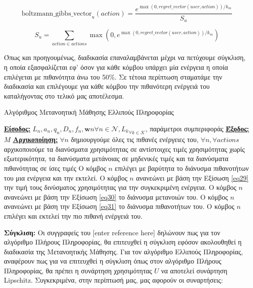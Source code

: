 \vspace{-3pt}

\[
\text{boltzmann\_gibbs\_vector}_u(action) = \frac{e^{\max(0, regret\_vector(user, action))/k_m}}{S_u}
\]

\[S_u = \sum_{action \in actions} \max(0, e^{\max(0, regret\_vector(user, action))/k_m})\]

Όπως και προηγουμένως, διαδικασία επαναλαμβάνεται μέχρι να πετύχουμε σύγκλιση, η οποία εξασφαλίζεται εφ' όσον για κάθε κόμβου υπάρχει μία ενέργεια η οποία επιλέγεται με πιθανότητα άνω του 50\%. Σε τέτοια περίπτωση σταματάμε την διαδικασία και επιλέγουμε για κάθε κόμβου την πιθανότερη ενέργειά του καταλήγοντας στο τελικό μας αποτέλεσμα.

\begin{algorithm}[h]
\caption{Αλγόριθμος Μετανοητική Μάθησης Ελλιπούς Πληροφορίας} \label{algorithm 6}
\begin{algorithmic}[1]
\STATE \textbf{\underline{Είσοδος:}} ${L_n, a_n, q_n, D_n, f_n, \mathbf{w}n}{\forall n\in \mathcal{N}}, {L_k}_{\forall k \in \mathcal{K}}$, παράμετροι συμπεριφοράς
\STATE \textbf{\underline{Έξοδος:}}  $M$
\STATE \textbf{\underline{Αρχικοποίηση:}} $\forall n$ δημιουργούμε όλες τις πιθανές ενέργειες του, $\forall n, \forall actions$ αρχικοποιούμε τα διανύσματα χρησιμότητας σε αντίστοιχες τιμές χρησιμότητας χωρίς εξωτερικότητα, τα διανύσματα μετάνοιας σε μηδενικές τιμές και τα διανύσματα πιθανότητας σε ίσες τιμές
\STATE Ο κόμβος $n$ επιλέγει με βαρύτητα το διάνυσμα πιθανοτήτων του μια ενέργεια και την εκτελεί.
\ENDFOR
{}
\STATE Ο κόμβος $n$ ανανεώνει με βάση την Εξίσωση \ref{eq29} την τιμή τους δινύσματος χρησιμότητας για την συγκεκριμένη ενέργεια.
\STATE Ο κόμβος $n$ ανανεώνει με βάση την Εξίσωση \ref{eq30} το διάνυσμα μετανοιών του.
\STATE Ο κόμβος $n$ ανανεώνει με βάση την Εξίσωση \ref{eq31} το διάνυσμα πιθανοτήτων του.
\ENDFOR
\ENDWHILE
{}
\STATE Ο κόμβος $n$ επιλέγει και εκτελεί την πιο πιθανή ενέργειά του.
\ENDFOR
\end{algorithmic}
\end{algorithm}
\vspace{-7pt}

\textbf{Σύγκλιση:} Οι συγγραφείς του [enter reference here] δηλώνουν πως για τον αλγόριθμο Πλήρους Πληροφορίας, θα επιτευχθεί η σύγκλιση εφόσον ακολουθηθεί η διαδικασία της Μετανοητικής Μάθησης. Για τον αλγόριθμο Ελλιπούς Πληροφορίας, αναφέρουν πως για να επιτευχθεί η σύγκλιση όπως στον αλγόριθμο Πλήρους Πληροφορίας, θα πρέπει η συνάρτηση χρησιμότητας $U$ να αποτελεί συνάρτηση Lipschitz. Συγκεκριμένα, στην περίπτωσή μας, μας αφορούν οι συναρτήσεις:

